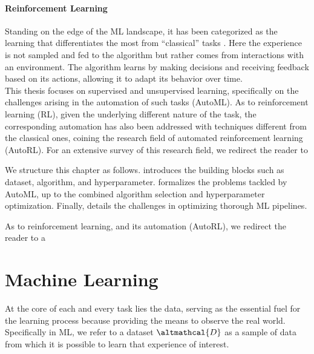 \paragraph{Reinforcement Learning}
Standing on the edge of the ML landscape, it has been categorized as the learning that differentiates the most from ``classical'' tasks \cite{sutton2018reinforcement}.
Here the experience is not sampled and fed to the algorithm but rather comes from interactions with an environment.
The algorithm learns by making decisions and receiving feedback based on its actions, allowing it to adapt its behavior over time.\\

This thesis focuses on supervised and unsupervised learning, specifically on the challenges arising in the automation of such tasks (AutoML).
As to reinforcement learning (RL), given the underlying different nature of the task, the corresponding automation has also been addressed with techniques different from the classical ones, coining the research field of automated reinforcement learning (AutoRL).
For an extensive survey of this research field, we redirect the reader to \cite{autorl}

We structure this chapter as follows.  introduces the building blocks such as dataset, algorithm, and hyperparameter.
 formalizes the problems tackled by AutoML, up to the combined algorithm selection and hyperparameter optimization.
Finally,  details the challenges in optimizing thorough ML pipelines.

As to reinforcement learning, and its automation (AutoRL), we redirect the reader to a 

\section{Machine Learning}\label{automl-background-sec:ml}

At the core of each and every task lies the data, serving as the essential fuel for the learning process because providing the means to observe the real world.
Specifically in ML, we refer to a dataset $\altmathcal{D}$ as a sample of data from which it is possible to learn that experience of interest.

